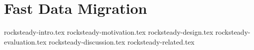 \chapter{Fast Data Migration}

 {rocksteady-intro.tex}
 {rocksteady-motivation.tex}
 {rocksteady-design.tex}
 {rocksteady-evaluation.tex}
 {rocksteady-discussion.tex}
 {rocksteady-related.tex}
